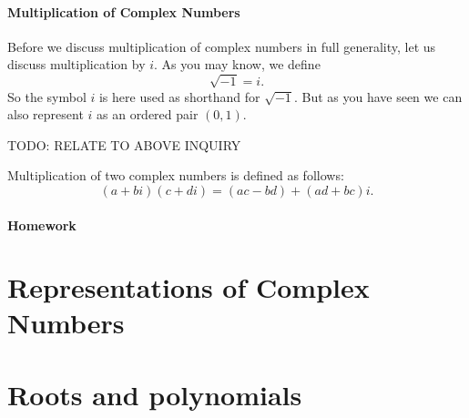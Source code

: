 \documentclass[11pt]{article}
\theoremstyle{definition}
\begin{document}
\subsection{Multiplication of Complex Numbers}

Before we discuss multiplication of complex numbers in full generality, let us discuss multiplication by $i$. As you may know, we define
\[ \sqrt{-1} = i. \]
So the symbol $i$ is here used as shorthand for $\sqrt{-1}$. But as you have seen we can also represent $i$ as an ordered pair $(0,1)$.

TODO: RELATE TO ABOVE INQUIRY

Multiplication of two complex numbers is defined as follows:
\[ (a+bi)(c+di) = (ac-bd) + (ad+bc)i.\]

\newpage
\subsection{Homework}

\newpage

\part{Representations of Complex Numbers}

\part{Roots and polynomials}
\end{document}
